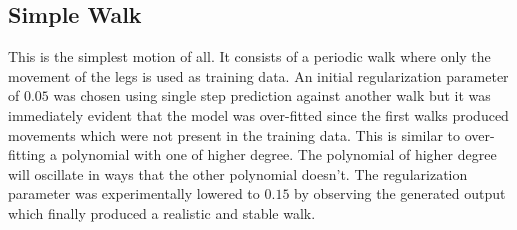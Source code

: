 \documentclass[letterpaper,9pt]{article}
\begin{document}
\subsection{Simple Walk}

This is the simplest motion of all. It consists of a periodic walk where only the movement of the legs is used as training data. An initial regularization parameter of $0.05$ was chosen using single step prediction against another walk but it was immediately evident that the model was over-fitted since the first walks produced movements which were not present in the training data. This is similar to over-fitting a polynomial with one of higher degree. The polynomial of higher degree will oscillate in ways that the other polynomial doesn't. The regularization parameter was experimentally lowered to $0.15$ by observing the generated output which finally produced a realistic and stable walk.
\end{document}
